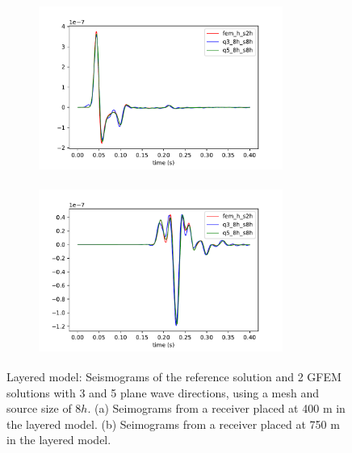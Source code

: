  \begin{figure}[h!]
 		\centering
		\begin{subfigure}{8cm}
				\includegraphics[width=8cm, height=5.5cm]{Thesis_Edith/figures/layered_model/layer_waves/gfem_layered_tr1.pdf} 
			     \caption{}
		\end{subfigure}
        \hspace{0.25cm}	
		\begin{subfigure}{8cm}
				\includegraphics[width=8cm, height=5.5cm]{Thesis_Edith/figures/layered_model/layer_waves/gfem_layered_tr50.pdf}
			   \caption{}
		\end{subfigure}
 
	\caption{Layered model: Seismograms of the reference solution and 2 GFEM solutions with 3 and 5 plane wave directions, using a mesh and source size of $8h$. (a) Seimograms from a receiver placed at 400 m in the layered model. (b) Seimograms from a receiver placed at 750 m in the layered model.}
	\label{fig:3.17}
\end{figure}

